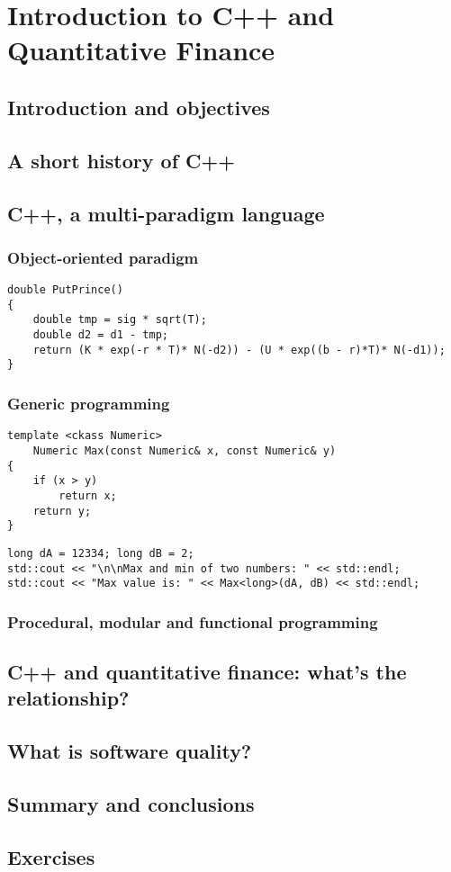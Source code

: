 \chapter{Introduction to C++ and Quantitative Finance}

\section{Introduction and objectives}

\section{A short history of C++}

\section{C++, a multi-paradigm language}

\subsection{Object-oriented paradigm}

\begin{lstlisting}
double PutPrince()
{
	double tmp = sig * sqrt(T);
	double d2 = d1 - tmp;
	return (K * exp(-r * T)* N(-d2)) - (U * exp((b - r)*T)* N(-d1));
}
\end{lstlisting}

\subsection{Generic programming}

\begin{lstlisting}
template <ckass Numeric>
	Numeric Max(const Numeric& x, const Numeric& y)
{
	if (x > y)
		return x;
	return y;
}
\end{lstlisting}

\begin{lstlisting}
long dA = 12334; long dB = 2;
std::cout << "\n\nMax and min of two numbers: " << std::endl;
std::cout << "Max value is: " << Max<long>(dA, dB) << std::endl;
\end{lstlisting}

\subsection{Procedural, modular and functional programming}

\section{C++ and quantitative finance: what’s the relationship?}

\section{What is software quality?}

\section{Summary and conclusions}

\section{Exercises}